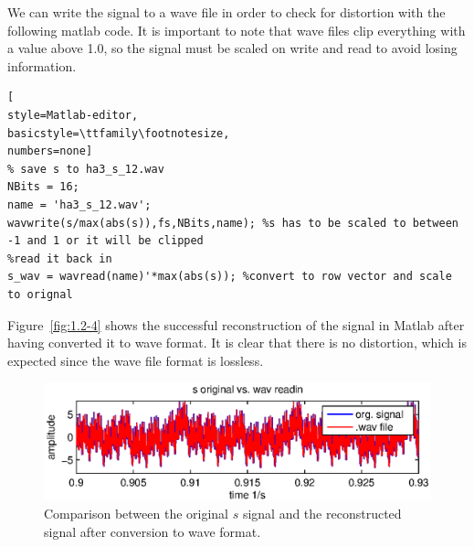 We can write the signal to a wave file in order to check for distortion with the following matlab code. It is important to note
that wave files clip everything with a value above 1.0, so the signal must be scaled on write and read to avoid losing information.
\begin{lstlisting}[
style=Matlab-editor,
basicstyle=\ttfamily\footnotesize,
numbers=none]
% save s to ha3_s_12.wav
NBits = 16;
name = 'ha3_s_12.wav';
wavwrite(s/max(abs(s)),fs,NBits,name); %s has to be scaled to between -1 and 1 or it will be clipped
%read it back in
s_wav = wavread(name)'*max(abs(s)); %convert to row vector and scale to orignal
\end{lstlisting}

Figure~\ref{fig:1.2-4} shows the successful reconstruction of the signal in Matlab after having converted it to wave format. It
is clear that there is no distortion, which is expected since the wave file format is lossless.


\begin{figure}[H]
	\center
	\includegraphics{./picture/3-1-6.eps}
	\caption{Comparison between the original \(s\) signal and the reconstructed signal after conversion to wave format.}
	\label{fig:1.2-3}
\end{figure}
